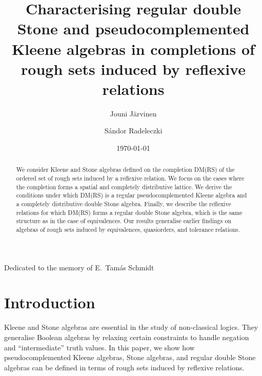 \documentclass[11pt,a4paper]{amsart}
\theoremstyle{plain}
\theoremstyle{definition}
\theoremstyle{remark}
\numberwithin{equation}{section}
\begin{document}
\date{\today}

\title[Characterising some Stone and Kleene algebras of rough sets]%
{Characterising regular double Stone and pseudocomplemented Kleene algebras in completions of rough sets induced by reflexive relations}

\author{Jouni J\"{a}rvinen}
\address[J.~J{\"a}rvinen]{Software Engineering, LUT School of Engineering Science, Mukkulankatu~19, 15210 Lahti, Finland}

\author{S\'{a}ndor Radeleczki}
\address[S.~Radeleczki]{Institute of Mathematics, University of Miskolc, 3515 Miskolc-Egyetemv\'{a}ros, Hungary}


\begin{abstract}
We consider Kleene and Stone algebras defined on the completion DM(RS) of the ordered set of rough sets induced by a reflexive relation. We focus on the cases where the completion forms a spatial and completely distributive lattice. We derive the conditions under which DM(RS) is a regular pseudocomplemented Kleene algebra and a completely distributive double Stone algebra. Finally, we describe the reflexive relations for which DM(RS) forms a regular double Stone algebra, which is the same structure as in the case of equivalences. Our results generalise earlier findings on algebras of rough sets induced by equivalences, quasiorders, and tolerance relations.
\end{abstract}

\maketitle

\hfill%
Dedicated to the memory of E.~Tam\'{a}s Schmidt

\section{Introduction} \label{sec:intro}
Kleene and Stone algebras are essential in the study of non-classical 
logics. They generalise Boolean algebras by relaxing certain 
constraints to handle negation and ``intermediate'' truth values. In 
this paper, we show how pseudocomplemented Kleene algebras, Stone algebras, and regular double Stone algebras can be defined in terms 
of rough sets induced by reflexive relations.
\end{document}
